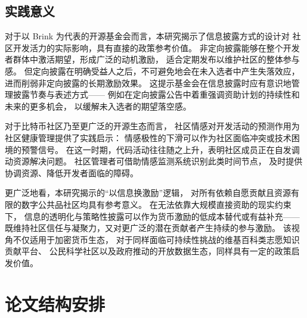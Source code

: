 \subsection{实践意义}

对于以 Brink 为代表的开源基金会而言，本研究揭示了信息披露方式的设计对
社区开发活力的实际影响，具有直接的政策参考价值。
非定向披露能够在整个开发者群体中激活期望，形成广泛的动机激励，
适合定期发布以维护社区的整体参与感。
但定向披露在明确受益人之后，不可避免地会在未入选者中产生失落效应，
进而削弱非定向披露的长期激励效果。
这提示基金会在信息披露时应有意识地管理披露节奏与表述方式——
例如在定向披露公告中着重强调资助计划的持续性和未来的更多机会，
以缓解未入选者的期望落空感。

对于比特币社区乃至更广泛的开源生态而言，
社区情感对开发活动的预测作用为社区健康管理提供了实践启示：
情感极性的下滑可以作为社区面临冲突或技术困境的预警信号。
在这一时期，代码活动往往随之上升，表明社区成员正在自发调动资源解决问题。
社区管理者可借助情感监测系统识别此类时间节点，
及时提供协调资源、降低开发者面临的障碍。

更广泛地看，本研究揭示的“以信息换激励”逻辑，
对所有依赖自愿贡献且资源有限的数字公共品社区均具有参考意义。
在无法依靠大规模直接资助的现实约束下，
信息的透明化与策略性披露可以作为货币激励的低成本替代或有益补充——
既维持社区信任与凝聚力，又对更广泛的潜在贡献者产生持续的参与激励。
该视角不仅适用于加密货币生态，
对于同样面临可持续性挑战的维基百科类志愿知识贡献平台、
公民科学社区以及政府推动的开放数据生态，同样具有一定的政策启发价值。

\section{论文结构安排}

